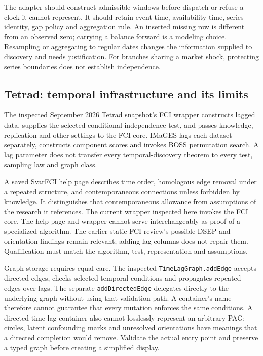 The adapter should construct admissible windows before dispatch or refuse a
clock it cannot represent. It should retain event time, availability time,
series identity, gap policy and aggregation rule. An inserted missing row is
different from an observed zero; carrying a balance forward is a modeling
choice. Resampling or aggregating to regular dates changes the information
supplied to discovery and needs justification. For branches sharing a market
shock, protecting series boundaries does not establish independence.
\citep{exec15_javatemporal_design}

\subsection{Tetrad: temporal infrastructure and its limits}

The inspected September 2026 Tetrad snapshot's FCI wrapper constructs lagged
data, supplies the selected conditional-independence test, and passes knowledge,
replication and other settings to the FCI core. IMaGES lags each dataset
separately, constructs component scores and invokes BOSS permutation search.
A lag parameter does not transfer every temporal-discovery theorem to every
test, sampling law and graph class.~\citep{exec15_javatemporal_tetrad}

A saved SvarFCI help page describes time order, homologous edge removal under
a repeated structure, and contemporaneous connections unless forbidden by
knowledge. It distinguishes that contemporaneous allowance from assumptions
of the research it references. The current wrapper inspected here invokes
the FCI core. The help page and wrapper cannot serve interchangeably as proof
of a specialized algorithm. The earlier static FCI review's possible-DSEP and
orientation findings remain relevant; adding lag columns does not repair
them. Qualification must match the algorithm, test, representation and
assumptions.~\citep{exec15_javatemporal_tetrad,exec14_java_latent_sources}

Graph storage requires equal care. The inspected
\texttt{TimeLagGraph.addEdge} accepts directed edges, checks selected temporal
conditions and propagates repeated edges over lags. The separate
\texttt{addDirectedEdge} delegates directly to the underlying graph without
using that validation path. A container's name therefore cannot guarantee
that every mutation enforces the same conditions. A directed time-lag
container also cannot losslessly represent an arbitrary PAG: circles, latent
confounding marks and unresolved orientations have meanings that a directed
completion would remove. Validate the actual entry point and preserve a typed
graph before creating a simplified display.
\citep{exec15_javatemporal_tetrad,exec15_javatemporal_design}

